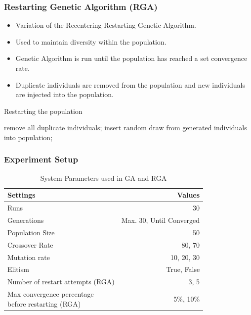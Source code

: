 \documentclass[10pt]{beamer}
\begin{document}
\begin{frame}
	\frametitle{Restarting Genetic Algorithm (RGA)}

	\begin{itemize}
		\item Variation of the Recentering-Restarting Genetic Algorithm.
		\item Used to maintain diversity within the population.
		\item Genetic Algorithm is run until the population has reached a set convergence rate.
		\item Duplicate individuals are removed from the population and new individuals are injected into the population.
	\end{itemize}

	\begin{algorithm}[H]
		\caption{Restarting the population}
		\begin{algorithmic}[1]

		  \STATE remove all duplicate individuals;
		    \STATE insert random draw from generated individuals into population;
		  \ENDWHILE
		\ENDIF

		\end{algorithmic}
	\end{algorithm}

\end{frame}

\begin{frame}
	\frametitle{Experiment Setup}

	\begin{table}
		\caption{System Parameters used in GA and RGA}
		\begin{tabular}{ | l | r | }
		  \hline
		    Settings & Values \\ \hline \hline
		    Runs & 30 \\ \hline
		    Generations & Max. 30, Until Converged \\ \hline
		    Population Size & 50 \\ \hline
		    Crossover Rate & 80, 70 \\ \hline
		    Mutation rate & 10, 20, 30 \\ \hline
		    Elitism & True, False \\ \hline
		    Number of restart attempts (RGA) & 3, 5 \\ \hline
		    \shortstack{Max convergence percentage \\ before restarting (RGA)} & 5\%, 10\% \\ \hline
		\end{tabular}
	\end{table}
\end{frame}
\end{document}
